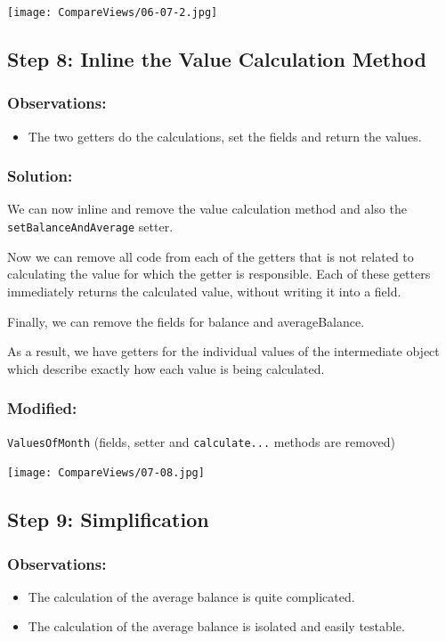 \documentclass[a4paper,fleqn,titlepage,11pt]{article}
\begin{document}
\texttt{[image: CompareViews/06-07-2.jpg]}



\subsection*{Step 8: Inline the Value Calculation Method}

\subsubsection*{Observations:}
\begin{itemize}
\item The two getters do the calculations, set the fields and return the values. 
\end{itemize}

\subsubsection*{Solution:}

We can now inline and remove the value calculation method and also the \texttt{setBalanceAndAverage} setter.

Now we can remove all code from each of the getters that is not related to calculating the value for which the getter is responsible. Each of these getters immediately returns the calculated value, without writing it into a field.

Finally, we can remove the fields for balance and averageBalance.

As a result, we have getters for the individual values of the intermediate object which describe exactly how each value is being calculated.

\subsubsection*{Modified:}

\texttt{ValuesOfMonth} (fields, setter and \texttt{calculate...} methods are removed)

\texttt{[image: CompareViews/07-08.jpg]}



\subsection*{Step 9: Simplification}

\subsubsection*{Observations:}
\begin{itemize}
\item The calculation of the average balance is quite complicated.
\item The calculation of the average balance is isolated and easily testable.
\end{itemize}
\end{document}
